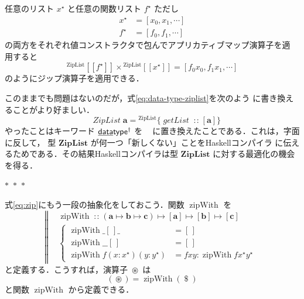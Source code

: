 \documentclass[a5paper,twoside,fleqn,draft]{jsbook}
\def\[{\left[\!\left[}
\def\]{\right]\!\right]}
\newcommand{\separator}{\begin{center}$*$~$*$~$*$\end{center}}
\newcommand{\programminglanguage}[1]{\textsf{#1}}
\newcommand{\haskell}{\programminglanguage{Haskell}}
\newcommand{\mBrace}{\Vert}
\newcommand{\mKeyword}[1]{\mathsf{#1}} %
\newcommand{\mKeywordUnderline}[1]{\text{\underline{\textsf{#1}}}} %
\newcommand{\mDataTypeKeyword}{\mKeywordUnderline{data}\mKeyword{type}}
\newcommand{\mNewDataTypeKeyword}{\mKeyword{newtype}}
\DeclareMathOperator{\mDataTypeParametric}{\mDataTypeKeyword^\dagger}
\DeclareMathOperator{\mNewDataTypeParametric}{\mNewDataTypeKeyword^\dagger}
\newcommand{\mEmptyList}{{[\,]}}
\newcommand{\mAnyParam}{\_}
\newcommand{\mFunc}[1]{\mathop{\mathit{#1}}}
\newcommand{\mSpecialFunc}[1]{\mathrm{#1}}
\DeclareMathOperator{\mGetList}{\mFunc{getList}}
\DeclareMathOperator{\mZipWith}{\mSpecialFunc{zipWith}}
\DeclareMathOperator{\mApply}{\$}
\DeclareMathOperator{\mAppMap}{\times}
\DeclareMathOperator{\mIn}{{:\!:}}
\DeclareMathOperator{\mMapsTo}{\mapsto}
\DeclareMathOperator{\mZip}{\circledast}
\newcommand{\mZipList}{ZipList}
\newcommand{\mType}[1]{\mathbf{#1}}
\newcommand{\mListType}[1]{[\mType{#1}]}
\newcommand{\mTypeConstructor}[1]{\textit{#1}}
\DeclareMathOperator{\mZipListTypeConstructor}{\mTypeConstructor{\mZipList}}
\newcommand{\mValueConstructor}[1]{\mathrm{#1}}
\newcommand{\mGenericValueAssemble}[2]{{}^\mValueConstructor{#1}\[#2\]}
\newcommand{\mGenericRecordWith}[2]{{}^\mValueConstructor{#1}\{#2\}}
\newcommand{\mZipListWith}[1]{\mGenericValueAssemble{\mZipList}{#1}}
\newcommand{\mZipListRecordWith}[1]{\mGenericRecordWith{\mZipList}{#1}}
\newcommand{\mListWith}[1]{\left[#1\right]}
\newcommand{\mList}[1]{{#1}^\mathrm{\star}}
\newcommand{\mProj}[2]{#1\mMapsTo#2}
\begin{document}
任意のリスト $\mList{x}$ と任意の関数リスト $\mList{f}$ ただし
\begin{align}
\mList{x}&=\mListWith{x_0,x_1,\dotsb}\\
\mList{f}&=\mListWith{f_0,f_1,\dotsb}
\end{align}
の両方をそれぞれ値コンストラクタで包んでアプリカティブマップ演算子を適
用すると
\begin{equation}
\mZipListWith{\mList{f}}\mAppMap\mZipListWith{\mList{x}}
=\mListWith{f_0x_0,f_1x_1,\dotsb}
\end{equation}
のようにジップ演算子を適用できる．

このままでも問題はないのだが，式\eqref{eq:data-type-ziplist}を次のよう
に書き換えることがより好ましい．
\begin{equation}
\mNewDataTypeParametric\;\mZipListTypeConstructor\mType{a}=\mZipListRecordWith{\mGetList\mIn{}\mListType{a}}
\end{equation}
やったことはキーワード $\mDataTypeParametric$ を
$\mNewDataTypeParametric$ に置き換えたことである．これは，字面に反して，
型 $\mType{\mZipList}$ が何一つ「新しくない」ことを\haskell コンパイラ
に伝えるためである．その結果\haskell コンパイラは型
$\mType{\mZipList}$ に対する最適化の機会を得る．

\separator

式\eqref{eq:zip}にもう一段の抽象化をしておこう．関数 $\mZipWith$ を
\begin{equation}
  \left\mBrace
  \begin{aligned}
    {}&\mZipWith\mIn{}\mProj{\mProj{\mProj{(\mProj{\mType{a}}
          {\mProj{\mType{b}}{\mType{c}}})}
        {\mListType{a}}}{\mListType{b}}}{\mListType{c}}\\
    {}&\left\{\begin{aligned}
    \mZipWith\mAnyParam\mEmptyList\mAnyParam
    &=\mEmptyList\\
    \mZipWith\mAnyParam\mAnyParam\mEmptyList
    &=\mEmptyList\\
    \mZipWith f(x:\mList{x})(y:\mList{y})
    &=fxy:\mZipWith f\mList{x}\mList{y}
    \end{aligned}
    \right.
  \end{aligned}
  \right.
\end{equation}
と定義する．こうすれば，演算子 $\mZip$ は
\begin{equation}
(\mZip)=\mZipWith(\mApply)
\end{equation}
と関数 $\mZipWith$ から定義できる．
\end{document}
